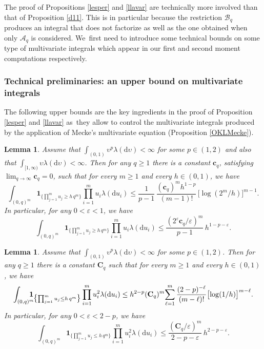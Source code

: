 \documentclass[JEP,XML,SOM,Unicode,published]{cedram}
\let\mathcal\mathscr
\newtheorem{lemma}[theorem]{Lemma}
\theoremstyle{definition}
\newcommand{\bc}{\boldsymbol{c}}
\newcommand{\dd}{\mathrm{d}}
\newcommand{\ind}{\mathbf{1}}
\newcommand{\cA}{{\ensuremath{\mathcal A}} }
\newcommand{\cB}{{\ensuremath{\mathcal B}} }
\newcommand{\bC}{{\ensuremath{\mathbf C}} }
\let\gep\varepsilon
\let\ups\upsilon
\begin{document}
The proof of Propositions \ref{lesper} and \ref{llavar} are technically more involved than that of Proposition \ref{d11}. This is in particular because the restriction $\cB_q$ produces an integral that does not factorize as well as the one obtained when only $\cA_q$ is considered. We~first need to introduce some technical bounds on some type of multivariate integrals which appear in our first and second moment computations respectively.

\subsubsection{Technical preliminaries: an upper bound on multivariate integrals}

The following upper bounds are the key ingredients in the proof of Proposition \ref{lesper} and \ref{llavar} as~they allow to control the multivariate integrals produced by the application of Mecke's multivariate equation (Proposition \ref{OKLMecke}).

\begin{lemma}
\label{lem:tailzzz1}
Assume that $\int_{(0,1)} \ups^p \lambda(\dd \ups) <\infty$
for some $p \in (1,2)$ and also that $\int_{[1,\infty)} \ups \lambda(\dd \ups)\!<\!\infty$. Then for any $q\!\geq\!1$ there is
a constant $\bc_q$, satisfying $\lim_{q\to\infty} \bc_q\!=\!0$,
such that for every $m\geq 1$ and every $h\in (0,1)$, we have
\begin{equation}
\label{firstline1}
\int_{(0,q)^m} \ind_{\bigl\{\prod^m_{j=1}u_j \ge h\, q^m\bigr\}} \prod_{i=1}^m u_i \lambda(\dd u_i) \le \frac{1}{p-1}\,
\frac{ (\bc_q)^m h^{1-p} }{(m-1)!}\, \bigl[ \log (2^m/h)\bigr]^{m-1}.
\end{equation}
In particular, for any $0< \gep < 1$, we have
\begin{equation}
\label{secondline}
\int_{(0,q)^m} \ind_{\bigl\{\prod^m_{j=1}u_j \ge h \, q^m\bigr\}} \prod_{i=1}^m u_i \lambda(\dd u_i) \le \frac{ (2^{\gep}\bc_q /\gep)^{m} }{p-1} \, h^{1-p-\gep}.
\end{equation}
\end{lemma}

\begin{lemma}
\label{lem:tailzzz2}
Assume that $\int_{(0,1)} \ups^p \lambda(\dd \ups) <\infty$
for some $p \in (1,2)$. Then for any $q\geq 1$ there is
a constant $\bC_q$
such that for every $m\geq 1$ and every $h\in (0,1)$, we have
\begin{equation}
\label{firstline2}
\int_{(0,q)^m} \hspace*{-3mm}\ind_{\bigl\{\prod^m_{j=1}u_j \le h\, q^m\bigr\}} \prod_{i=1}^m u_i^2 \lambda(\dd u_i) \le
h^{2-p}  (\bC_q)^{m}\!\sum_{\ell=1}^{m}\frac{(2-p)^{-\ell}}{(m-\ell)!} \bigl[\log (1/h)\bigr]^{m-\ell}.
\end{equation}
In particular, for any $0< \gep < 2-p$, we have
\begin{equation}
\label{thirdline}
\int_{(0,q)^m} \ind_{\bigl\{\prod^m_{j=1}u_j \le h\, q^m\bigr\}} \prod_{i=1}^m u^2_i \lambda(\dd u_i) \le \frac{ (\bC_q/\gep)^m }{2- p-\gep} \, h^{2-p-\gep}.
\end{equation}
\end{lemma}
\end{document}
